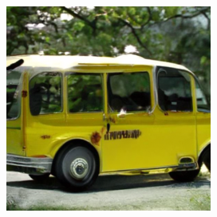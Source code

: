 \documentclass{article}
\begin{document}
\begin{figure}
\begin{subfigure}[b]{0.19\linewidth}
    \end{subfigure}
    \begin{subfigure}[b]{0.19\linewidth}
    \includegraphics[width=\linewidth]{figures/imagenet256/solver_samples/imagenet256_fm_ot_16_50.png}
    \end{subfigure}\\
    

\end{figure}
\end{document}
